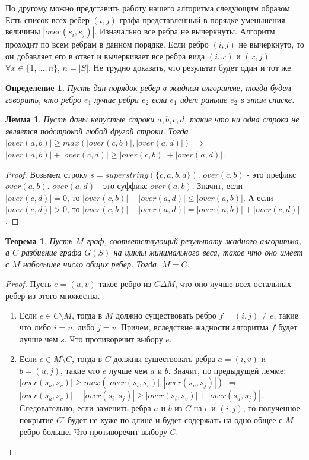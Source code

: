 \documentclass[a4paper,10pt]{article}
\newtheorem{theorem}{Теорема}
\newtheorem{lemma}{Лемма}
\newtheorem{definition}{Определение}
\begin{document}
По другому можно представить работу нашего алгоритма следующим образом.
Есть список всех ребер $(i, j)$ графа представленный в порядке уменьшения величины $|over(s_i, s_j)|$.
Изначально все ребра не вычеркнуты.
Алгоритм проходит по всем ребрам в данном порядке. Если ребро $(i, j)$ не вычеркнуто, 
то он добавляет его в ответ и вычеркивает все ребра вида $(i, x)$ и $(x, j)$ $\forall x \in \{ 1, \dots, n \}$, $n = |S|$.
Не трудно доказать, что результат будет один и тот же.

\begin{definition}
Пусть дан порядок ребер в жадном алгоритме, тогда будем говорить, что ребро $e_1$ лучше ребра $e_2$ если $e_1$ идет раньше $e_2$ в этом списке.
\end{definition}

\begin{lemma}
Пусть даны непустые строки $a,b,c,d$, такие что ни одна строка не является подстрокой любой другой строки.
Тогда $|over(a, b)| \geq max( |over(c, b)|, |over(a, d)| )$ $\Rightarrow$ $|over(a, b)| + |over(c, d)| \geq |over(c, b)| + |over(a, d)|$.
\end{lemma}

\begin{proof}
Возьмем строку $s = superstring(\{ c, a, b, d \})$.
$over(c, b)$ - это префикс $over(a, b)$. $over(a, d)$ - это суффикс $over(a, b)$.
Значит, если $|over(c, d)| = 0$, то $|over(c, b)| + |over(a, d)| \leq |over(a, b)|$.
А если $|over(c, d)| > 0$, то $|over(c, b)| + |over(a, d)| = |over(a, b)| + |over(c, d)|$.
\end{proof}

\begin{theorem}
Пусть $M$ граф, соответствующий результату жадного алгоритма, а $C$ разбиение графа $G(S)$ на циклы минимального веса, такое что оно имеет с $M$ набольшее число общих ребер.
Тогда, $M = C$.
\end{theorem}

\begin{proof}
Пусть $e = (u, v)$ такое ребро из $C \Delta M$, что оно лучше всех остальных ребер из этого множества.
\begin{enumerate}
\item Если $e \in C \setminus M $, тогда в $M$ должно существовать ребро $f = (i, j) \ne e$, такие что либо $i = u$, либо $j = v$.
Причем, вследствие жадности алгоритма $f$ будет лучше чем $s$. Что противоречит выбору $e$.
\item Если $e \in M \setminus C $, тогда в $C$ должны существовать ребра $a = (i, v)$ и $b = (u, j)$, такие что $e$ лучше чем $a$ и $b$.
Значит, по предыдущей лемме: $|over(s_u, s_v)| \geq max( |over(s_i, s_v)|, |over(s_u, s_j)| )$ $\Rightarrow$ 
$|over(s_u, s_v)| + |over(s_i, s_j)| \geq |over(s_i, s_v)| + |over(s_u, s_j)|$.
Следовательно, если заменить ребра $a$ и $b$ из $C$ на $e$ и $(i, j)$, то полученное покрытие $C'$ будет не хуже по длине и будет содержать на одно общее с $M$ ребро больше.
Что противоречит выбору $C$.
\end{enumerate}
\end{proof}
\end{document}
